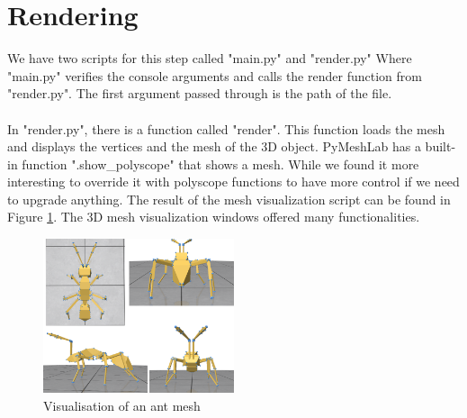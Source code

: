\documentclass[10pt,twocolumn,letterpaper]{article}
\begin{document}
\section{Rendering}
We have two scripts for this step called "main.py" and "render.py" Where "main.py" verifies the console arguments and calls the render function from "render.py". The first argument passed through is the path of the file. \\ \\
In "render.py", there is a function called "render". This function loads the mesh and displays the vertices and the mesh of the 3D object. PyMeshLab has a built-in function ".show\_polyscope" that shows a mesh. While we found it more interesting to override it with polyscope functions to have more control if we need to upgrade anything. The result of the mesh visualization script can be found in Figure \ref{fig:ant-mesh}. The 3D mesh visualization windows offered many functionalities.

	
	
\begin{figure}[h!]
\begin{center}
  \includegraphics[width=0.5\textwidth]{ant}
  \caption{Visualisation of an ant mesh}
  \label{fig:ant-mesh}
  \end{center}
\end{figure}
\medskip
\printbibliography
\end{document}
